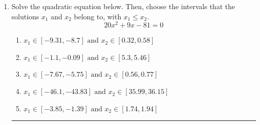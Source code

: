 \documentclass[14pt]{extbook}
\newcommand{\litem}[1]{\item#1\hspace*{-1cm}\rule{\textwidth}{0.4pt}}
\begin{document}
\begin{enumerate}
\litem{
Solve the quadratic equation below. Then, choose the intervals that the solutions $x_1$ and $x_2$ belong to, with $x_1 \leq x_2$.\[ 20x^{2} +9 x -81 = 0 \]\begin{enumerate}[label=\Alph*.]
\item \( x_1 \in [-9.31, -8.7] \text{ and } x_2 \in [0.32, 0.58] \)
\item \( x_1 \in [-1.1, -0.09] \text{ and } x_2 \in [5.3, 5.46] \)
\item \( x_1 \in [-7.67, -5.75] \text{ and } x_2 \in [0.56, 0.77] \)
\item \( x_1 \in [-46.1, -43.83] \text{ and } x_2 \in [35.99, 36.15] \)
\item \( x_1 \in [-3.85, -1.39] \text{ and } x_2 \in [1.74, 1.94] \)


\end{enumerate}}
\end{enumerate}
\end{document}
